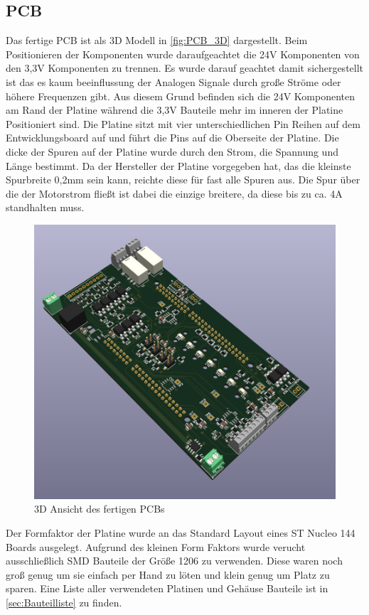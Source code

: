 \subsection{\ac{PCB}}
Das fertige PCB ist als 3D Modell in \autoref{fig:PCB_3D} dargestellt. Beim Positionieren der Komponenten wurde daraufgeachtet die 24V Komponenten von den 3,3V Komponenten zu trennen. Es wurde darauf geachtet damit sichergestellt ist das es kaum beeinflussung der Analogen Signale durch große Ströme oder höhere Frequenzen gibt. Aus diesem Grund befinden sich die 24V Komponenten am Rand der Platine während die 3,3V Bauteile mehr im inneren der Platine Positioniert sind. Die Platine sitzt mit vier unterschiedlichen Pin Reihen auf dem Entwicklungsboard auf und führt die Pins auf die Oberseite der Platine. Die dicke der Spuren auf der Platine wurde durch den Strom, die Spannung und Länge bestimmt. Da der Hersteller der Platine vorgegeben hat, das die kleinste Spurbreite 0,2mm sein kann, reichte diese für fast alle Spuren aus. Die Spur über die der Motorstrom fließt ist dabei die einzige breitere, da diese bis zu ca. 4A standhalten muss. 
\begin{figure}[H]
	\centering
	\includegraphics[width=1.0\textwidth]{images/Hardware/Platine_Fertig_3D_ansicht(1).PNG}
	\caption{3D Ansicht des fertigen PCBs}
	\label{fig:PCB_3D}
\end{figure}
Der Formfaktor der Platine wurde an das Standard Layout eines ST Nucleo 144 Boards ausgelegt. Aufgrund des kleinen Form Faktors wurde verucht ausschließlich \ac{SMD} Bauteile der Größe 1206 zu verwenden. Diese waren noch groß genug um sie einfach per Hand zu löten und klein genug um Platz zu sparen. Eine Liste aller verwendeten Platinen und Gehäuse Bauteile ist in \autoref{sec:Bauteilliste} zu finden.


